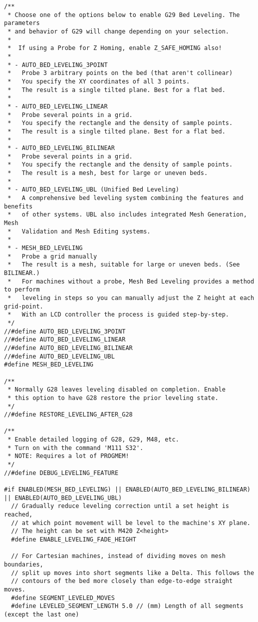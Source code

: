 \begin{lstlisting}
/**
 * Choose one of the options below to enable G29 Bed Leveling. The parameters
 * and behavior of G29 will change depending on your selection.
 *
 *  If using a Probe for Z Homing, enable Z_SAFE_HOMING also!
 *
 * - AUTO_BED_LEVELING_3POINT
 *   Probe 3 arbitrary points on the bed (that aren't collinear)
 *   You specify the XY coordinates of all 3 points.
 *   The result is a single tilted plane. Best for a flat bed.
 *
 * - AUTO_BED_LEVELING_LINEAR
 *   Probe several points in a grid.
 *   You specify the rectangle and the density of sample points.
 *   The result is a single tilted plane. Best for a flat bed.
 *
 * - AUTO_BED_LEVELING_BILINEAR
 *   Probe several points in a grid.
 *   You specify the rectangle and the density of sample points.
 *   The result is a mesh, best for large or uneven beds.
 *
 * - AUTO_BED_LEVELING_UBL (Unified Bed Leveling)
 *   A comprehensive bed leveling system combining the features and benefits
 *   of other systems. UBL also includes integrated Mesh Generation, Mesh
 *   Validation and Mesh Editing systems.
 *
 * - MESH_BED_LEVELING
 *   Probe a grid manually
 *   The result is a mesh, suitable for large or uneven beds. (See BILINEAR.)
 *   For machines without a probe, Mesh Bed Leveling provides a method to perform
 *   leveling in steps so you can manually adjust the Z height at each grid-point.
 *   With an LCD controller the process is guided step-by-step.
 */
//#define AUTO_BED_LEVELING_3POINT
//#define AUTO_BED_LEVELING_LINEAR
//#define AUTO_BED_LEVELING_BILINEAR
//#define AUTO_BED_LEVELING_UBL
#define MESH_BED_LEVELING

/**
 * Normally G28 leaves leveling disabled on completion. Enable
 * this option to have G28 restore the prior leveling state.
 */
//#define RESTORE_LEVELING_AFTER_G28

/**
 * Enable detailed logging of G28, G29, M48, etc.
 * Turn on with the command 'M111 S32'.
 * NOTE: Requires a lot of PROGMEM!
 */
//#define DEBUG_LEVELING_FEATURE

#if ENABLED(MESH_BED_LEVELING) || ENABLED(AUTO_BED_LEVELING_BILINEAR) || ENABLED(AUTO_BED_LEVELING_UBL)
  // Gradually reduce leveling correction until a set height is reached,
  // at which point movement will be level to the machine's XY plane.
  // The height can be set with M420 Z<height>
  #define ENABLE_LEVELING_FADE_HEIGHT

  // For Cartesian machines, instead of dividing moves on mesh boundaries,
  // split up moves into short segments like a Delta. This follows the
  // contours of the bed more closely than edge-to-edge straight moves.
  #define SEGMENT_LEVELED_MOVES
  #define LEVELED_SEGMENT_LENGTH 5.0 // (mm) Length of all segments (except the last one)


\end{lstlisting}
